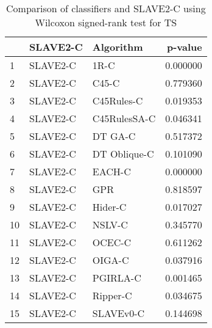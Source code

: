 \begin{table}
\footnotesize
\caption{Comparison of classifiers and SLAVE2-C using Wilcoxon signed-rank test for TS}
\label{tab:SLAVE2-C wilcoxon TS comparison}
\begin{tabular}{lllr}
\hline
 & SLAVE2-C & Algorithm & p-value \\
\hline
1 & SLAVE2-C & 1R-C & 0.000000 \\
2 & SLAVE2-C & C45-C & 0.779360 \\
3 & SLAVE2-C & C45Rules-C & 0.019353 \\
4 & SLAVE2-C & C45RulesSA-C & 0.046341 \\
5 & SLAVE2-C & DT GA-C & 0.517372 \\
6 & SLAVE2-C & DT Oblique-C & 0.101090 \\
7 & SLAVE2-C & EACH-C & 0.000000 \\
8 & SLAVE2-C & GPR & 0.818597 \\
9 & SLAVE2-C & Hider-C & 0.017027 \\
10 & SLAVE2-C & NSLV-C & 0.345770 \\
11 & SLAVE2-C & OCEC-C & 0.611262 \\
12 & SLAVE2-C & OIGA-C & 0.037916 \\
13 & SLAVE2-C & PGIRLA-C & 0.001465 \\
14 & SLAVE2-C & Ripper-C & 0.034675 \\
15 & SLAVE2-C & SLAVEv0-C & 0.144698 \\
\hline
\end{tabular}
\end{table}
